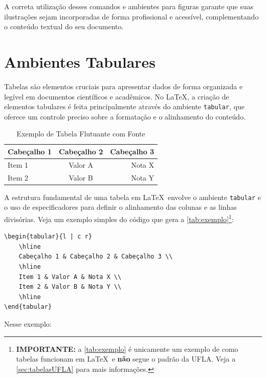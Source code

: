 A correta utilização desses comandos e ambientes para figuras garante que suas ilustrações sejam incorporadas de forma profissional e acessível, complementando o conteúdo textual do seu documento.





\section{Ambientes Tabulares}

Tabelas são elementos cruciais para apresentar dados de forma organizada e legível em documentos científicos e acadêmicos. No \LaTeX, a criação de elementos tabulares é feita principalmente através do ambiente \texttt{tabular}, que oferece um controle preciso sobre a formatação e o alinhamento do conteúdo. 

\begin{table}
	\centering
	\caption{Exemplo de Tabela Flutuante com Fonte}\label{tab:exemplo}
	\begin{tabular}{l | c r}
		\hline
		Cabeçalho 1 & Cabeçalho 2 & Cabeçalho 3 \\
		\hline
		Item 1 & Valor A & Nota X \\
		Item 2 & Valor B & Nota Y \\
		\hline
	\end{tabular}
	\vspace{.3cm}
\end{table}

A estrutura fundamental de uma tabela em \LaTeX\  envolve o ambiente \texttt{tabular} e o uso de especificadores para definir o alinhamento das colunas e as linhas divisórias. Veja um exemplo simples do código que gera a \autoref{tab:exemplo}\footnote
{\textbf{IMPORTANTE:} a \autoref{tab:exemplo} é unicamente um exemplo de como tabelas funcionam em \LaTeX\ e \textbf{não} segue o padrão da UFLA. Veja a \autoref{sec:tabelasUFLA} para mais informações.}:

\begin{lstlisting}[language={[LaTeX]TeX}]
\begin{tabular}{l | c r}
	\hline
	Cabeçalho 1 & Cabeçalho 2 & Cabeçalho 3 \\
	\hline
	Item 1 & Valor A & Nota X \\
	Item 2 & Valor B & Nota Y \\
	\hline
\end{tabular}
\end{lstlisting}
Nesse exemplo:

